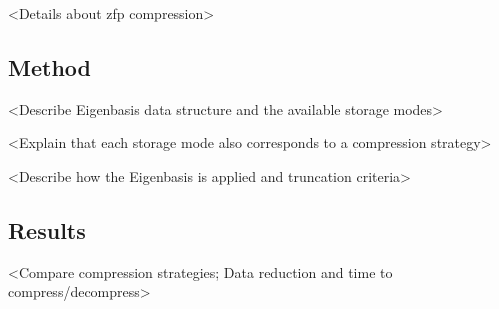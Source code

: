 {\color{blue} <Details about zfp compression> }

\subsection{Method}

{\color{blue} <Describe Eigenbasis data structure and the available storage modes> }

{\color{blue} <Explain that each storage mode also corresponds to a compression strategy> }

{\color{blue} <Describe how the Eigenbasis is applied and truncation criteria> }

\subsection{Results}

{\color{blue} <Compare compression strategies; Data reduction and time to compress/decompress> }
